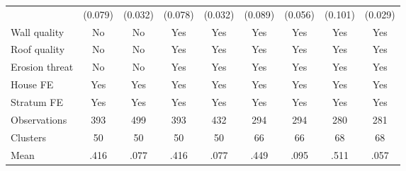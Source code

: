{\begin{tabular}{l*{8}{c}}
                &  (0.079)         &  (0.032)         &  (0.078)         &  (0.032)         &  (0.089)         &  (0.056)         &  (0.101)         &  (0.029)         \\
Wall quality    &       No         &       No         &      Yes         &      Yes         &      Yes         &      Yes         &      Yes         &      Yes         \\
Roof quality    &       No         &       No         &      Yes         &      Yes         &      Yes         &      Yes         &      Yes         &      Yes         \\
Erosion threat  &       No         &       No         &      Yes         &      Yes         &      Yes         &      Yes         &      Yes         &      Yes         \\
House FE        &      Yes         &      Yes         &      Yes         &      Yes         &      Yes         &      Yes         &      Yes         &      Yes         \\
Stratum FE      &      Yes         &      Yes         &      Yes         &      Yes         &      Yes         &      Yes         &      Yes         &      Yes         \\
\hline
Observations    &      393         &      499         &      393         &      432         &      294         &      294         &      280         &      281         \\
Clusters        &       50         &       50         &       50         &       50         &       66         &       66         &       68         &       68         \\
Mean            &     .416         &     .077         &     .416         &     .077         &     .449         &     .095         &     .511         &     .057         \\
\hline\hline
\end{tabular}
}
